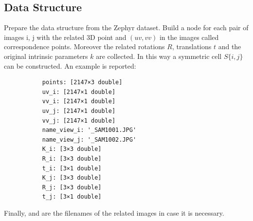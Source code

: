 \documentclass[12pt]{article}
\begin{document}
\subsection{Data Structure}
Prepare the data structure from the Zephyr dataset. Build a node for each pair of images i, j with the related 3D point and $(uv,vv)$ in the images called correspondence points. Moreover the related rotations $R$, translations $t$ and the original intrinsic parameters $k$ are collected. In this way a symmetric cell $S\{i,j\}$ can be constructed. An example is reported:
\begin{verbatim}
           points: [2147×3 double]
           uv_i: [2147×1 double]
           vv_i: [2147×1 double]
           uv_j: [2147×1 double]
           vv_j: [2147×1 double]
           name_view_i: '_SAM1001.JPG'
           name_view_j: '_SAM1002.JPG'
           K_i: [3×3 double]
           R_i: [3×3 double]
           t_i: [3×1 double]
           K_j: [3×3 double]
           R_j: [3×3 double]
           t_j: [3×1 double]
\end{verbatim}
Finally,  and  are the filenames of the related images in case it is necessary.
\end{document}
